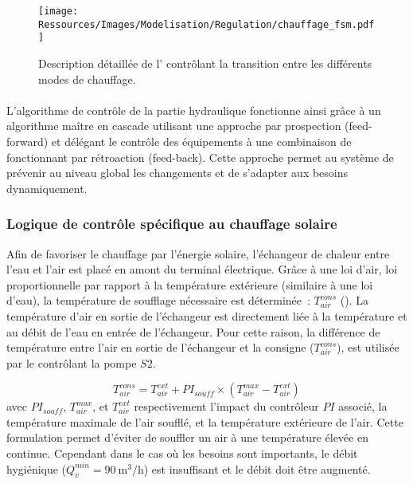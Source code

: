 \begin{figure}
    \centering
    \texttt{[image: Ressources/Images/Modelisation/Regulation/chauffage\_fsm.pdf]}
    \caption[ contrôlant la transition entre les différents modes de chauffage]
            {Description détaillée de l’ contrôlant la transition entre
             les différents modes de chauffage.}
    \label{fig:automate_chauffage}
\end{figure}


\paragraph{} %
\label{par:conclusion_algo}
L’algorithme de contrôle de la partie hydraulique fonctionne ainsi grâce à un algorithme
maître en cascade utilisant une approche par prospection (feed-forward) et délégant le
contrôle des équipements à une combinaison de  fonctionnant par rétroaction (feed-back).
Cette approche permet au système de prévenir au niveau global les changements et de
s’adapter aux besoins dynamiquement.


\subsubsection{Logique de contrôle spécifique au chauffage solaire} %
\label{ssub:logique_de_controle_specifique_au_chauffage_solaire}
Afin de favoriser le chauffage par l’énergie solaire, l’échangeur de chaleur entre l’eau
et l’air est placé en amont du terminal électrique. Grâce à une loi d’air, loi
proportionnelle par rapport à la température extérieure (similaire à une loi d’eau), la
température de soufflage nécessaire est déterminée~: $T_{air}^{cons}$ ().
La température d’air en sortie de l’échangeur est directement liée à la température et au
débit de l’eau en entrée de l’échangeur. Pour cette raison, la différence de température
entre l’air en sortie de l’échangeur et la consigne ($T_{air}^{cons}$), est utilisée
par le  contrôlant la pompe $S2$.

\begin{equation}\label{eq:temp_soufflage}
    T_{air}^{cons} = T_{air}^{ext} + PI_{souff} \times (T_{air}^{max} - T_{air}^{ext})
\end{equation}
avec $PI_{souff}$, $T_{air}^{max}$, et $T_{air}^{ext}$ respectivement l’impact du
contrôleur $PI$ associé, la température maximale de l’air soufflé, et la température
extérieure de l’air. Cette formulation permet d’éviter de souffler un air à une
température élevée en continue. Cependant dans le cas où les besoins sont importants, le
débit hygiénique ($Q_{v}^{min} = \SI[per-mode=symbol]{90}{\meter\cubed\per\hour}$) est insuffisant
et le débit doit être augmenté.

